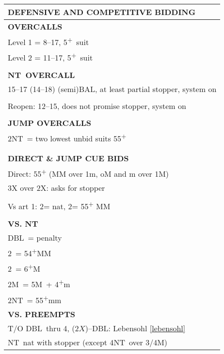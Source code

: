 \documentclass{article}
\newcommand{\C}{\texorpdfstring{\textcolor{ForestGreen}{\raisebox{-0.017em}{\ensuremath{\varclub}}}}{C}}
\newcommand{\D}{\texorpdfstring{\textcolor{YellowOrange}{\raisebox{-0.35pt}{\ensuremath{\vardiamond}}}}{D}}
\renewcommand{\H}{\texorpdfstring{\textcolor{Red}{\raisebox{-0.06em}{\ensuremath{\varheart}}}}{H}}
\newcommand\N{{\footnotesize NT}}
\newcommand{\+}{\textsuperscript{+}}
\newcommand{\X}{{\footnotesize{DBL}}}
\newcommand{\m}{m}
\newcommand{\M}{M}
\newcommand{\mm}{mm}
\newcommand{\MM}{MM}
\begin{document}
\newpage
\noindent
\small
  \begin{adjustbox}{valign=t,minipage={90mm}}
    \begin{tabular}{|p{88mm}|}
      \hline
      \cellcolor[gray]{0.9} \textbf{DEFENSIVE AND COMPETITIVE BIDDING} \\ \hline
      \textbf{OVERCALLS} \\ \hline
      Level 1 = 8--17, 5\+\ suit\\
      Level 2 = 11--17, 5\+\ suit\\
      \\
      \hline
      \textbf{\N \ OVERCALL} \\ \hline
      15--17 (14--18) (semi)BAL, at least partial stopper, system on\\
      \\
      Reopen: 12--15, does not promise stopper, system on\\
      \\
      \hline
      \textbf{JUMP OVERCALLS} \\ \hline
      2\N\ = two lowest unbid suits 55\+\\
      \\
      \\
      \hline
      \textbf{DIRECT \& JUMP CUE BIDS} \\ \hline
      Direct: 55\+ (MM over 1m, oM and m over 1M)\\
      3X over 2X: asks for stopper\\
      \\
      Vs art 1\D: 2\D = nat, 2\H = 55\+ MM\\
      \\
      \hline
      \textbf{VS. NT} \\ \hline
      \X\ = penalty \\
      2\C\ = 54\+MM \\
      2\D\ = 6\+\M \\
      2\M\ = 5\M\ + 4\+\m\\
      2\N\ = 55\+mm \\
      \hline
      \textbf{VS. PREEMPTS} \\ \hline
      T/O \X\ thru 4\D, (2$X$)--\X: Lebensohl \ref{lebensohl}\\
      \N\ nat with stopper (except 4\N\ over 3/4\M)\\

\end{tabular}
\end{adjustbox}
\end{document}
